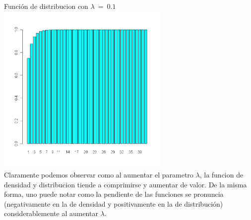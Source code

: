 \begin{itemize}
	Funci\'on de distribucion con $\lambda\ =\ 0.1$\\
  	  \includegraphics[width=3.3in,height=3.3in]{images/1_2-pgeom5.png}\\

	Claramente podemos observar como al aumentar el parametro $\lambda$, la funcion de densidad y distribucion tiende a comprimirse y aumentar de valor.
  De la misma forma, uno puede notar como la pendiente de las funciones se pronuncia (negativamente en la de densidad y positivamente en la de distribuci\'on) considerablemente al aumentar $\lambda$.

	


\end{itemize}
